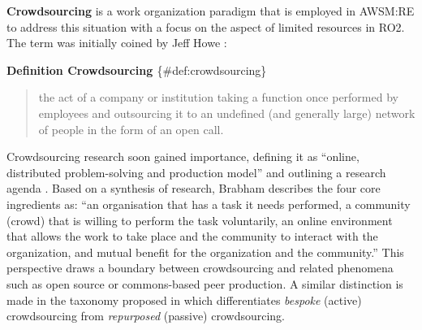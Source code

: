 \textbf{Crowdsourcing} is a work organization paradigm that is employed in AWSM:RE to address this situation with a focus on the aspect of limited resources in RO2.
The term was initially coined by Jeff Howe \autocite{Howe2006}:

\textbf{Definition Crowdsourcing \autocite{Howe2006}} \{\#def:crowdsourcing\}

\begin{quote}
the act of a company or institution taking a function once performed by employees and outsourcing it to an undefined (and generally large) network of people in the form of an open call.
\end{quote}

Crowdsourcing research soon gained importance, defining it as ``online, distributed problem-solving and production model'' and outlining a research agenda \autocite{Brabham2008}.
Based on a synthesis of research, Brabham describes the four core ingredients as: ``an organisation that has a task it needs performed, a community (crowd) that is willing to perform the task voluntarily, an online environment that allows the work to take place and the community to interact with the organization, and mutual benefit for the organization and the community.'' \autocite{Brabham2013} This perspective draws a boundary between crowdsourcing and related phenomena such as open source or commons-based peer production.
A similar distinction is made in the taxonomy proposed in \autocite{Mao2017} which differentiates \emph{bespoke} (active) crowdsourcing from \emph{repurposed} (passive) crowdsourcing.

